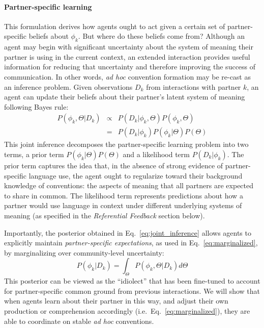 \paragraph{Partner-specific learning}


This formulation derives how agents ought to act given a certain set of partner-specific beliefs about $\phi_k$.
But where do these beliefs come from?
Although an agent may begin with significant uncertainty about the system of meaning their partner is using in the current context, an extended interaction provides useful information for reducing that uncertainty and therefore improving the success of communication.
In other words, \emph{ad hoc} convention formation may be re-cast as an inference problem.
Given observations $D_k$ from interactions with partner $k$, an agent can update their beliefs about their partner's latent system of meaning following Bayes rule:
\begin{equation}
\begin{array}{rcl}
\label{eq:joint_inference}
P(\phi_k, \Theta | D_k)  & \propto &  P(D_k | \phi_k, \Theta) P(\phi_k, \Theta) \\
                           & =   & P(D_k | \phi_k) P(\phi_k | \Theta) P(\Theta)
\end{array}
\end{equation}
This joint inference decomposes the partner-specific learning problem into two terms, a prior term $P(\phi_k | \Theta)P(\Theta)$ and a likelihood term $P(D_k | \phi_k)$.
The prior term captures the idea that, in the absence of strong evidence of partner-specific language use, the agent ought to regularize toward their background knowledge of conventions: the aspects of meaning that all partners are expected to share in common.
The likelihood term represents predictions about how a partner would use language in context under different underlying systems of meaning (as specified in the \emph{Referential Feedback} section below).

Importantly, the posterior obtained in Eq.~\ref{eq:joint_inference} allows agents to explicitly maintain \emph{partner-specific expectations}, as used in Eq.~\ref{eq:marginalized}, by marginalizing over community-level uncertainty:
\begin{equation}
P(\phi_k | D_k) =  \int_{\Theta}P(\phi_k, \Theta | D_k)  d\Theta
\end{equation}
This posterior can be viewed as the ``idiolect'' that has been fine-tuned to account for partner-specific common ground from previous interactions.
We will show that when agents learn about their partner in this way, and adjust their own production or comprehension accordingly (i.e.~Eq.~\ref{eq:marginalized}), they are able to coordinate on stable \emph{ad hoc} conventions.

